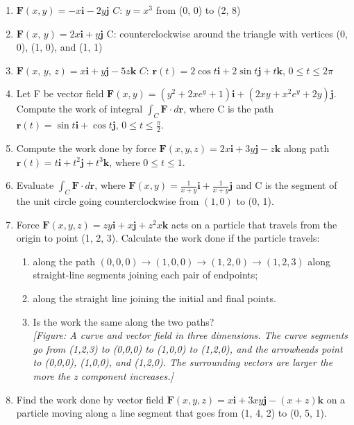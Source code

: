 \documentclass{exercises}
\begin{document}
\begin{enumerate}[resume]
\item $\mathbf{F}(x,y)=-x\mathbf{i}-2y\mathbf{j}$ $C{:}\,y=x^{3}$ from (0, 0) to (2, 8)
\item $\mathbf{F}(x,\,y)=2x\mathbf{i}+y\mathbf{j}$ C: counterclockwise around the triangle with vertices (0, 0), (1, 0), and (1, 1)
\item $\mathbf{F}(x,\,y,\,z)=x\mathbf{i}+y\mathbf{j}-5z\mathbf{k}$ $C{:}\,\mathbf{r}(t)=2\cos t\mathbf{i}+2\sin t\mathbf{j}+t\mathbf{k},\,0\le t\le2\pi$
\item Let F be vector field $\mathbf{F}(x,y)=(y^{2}+2xe^{y}+1)\mathbf{i}+(2xy+x^{2}e^{y}+2y)\mathbf{j}$. Compute the work of integral $\int_{C}^{}\mathbf{F}\cdot d\mathbf{r}$, where C is the path $\mathbf{r}(t)=\sin t\mathbf{i}+\cos t\mathbf{j},\,0\le t\le \frac{\pi}{2}$.
\item Compute the work done by force $\mathbf{F}(x,y,z)=2x\mathbf{i}+3y\mathbf{j}-z\mathbf{k}$ along path $\mathbf{r}(t)=t\mathbf{i}+t^{2}\mathbf{j}+t^{3}\mathbf{k}$, where $0\le t\le1$.
\item Evaluate $\int_{C}^{}\mathbf{F}\cdot d\mathbf{r}$, where $\mathbf{F}(x,y)=\frac{1}{x+y}\mathbf{i}+\frac{1}{x+y}\mathbf{j}$ and C is the segment of the unit circle going counterclockwise from $(1,0)$ to (0, 1).
\item Force $\mathbf{F}(x,y,z)=zy\mathbf{i}+x\mathbf{j}+z^{2}x\mathbf{k}$ acts on a particle that travels from the origin to point (1, 2, 3). Calculate the work done if the particle travels:
\begin{enumerate}[label=(\alph*)]
  \item along the path $(0,0,0)\to(1,0,0)\to(1,2,0)\to(1,2,3)$ along straight-line segments joining each pair of endpoints;
  \item along the straight line joining the initial and final points.
  \item Is the work the same along the two paths?\\ \textit{[Figure: A curve and vector field in three dimensions. The curve segments go from (1,2,3) to (0,0,0) to (1,0,0) to (1,2,0), and the arrowheads point to (0,0,0), (1,0,0), and (1,2,0). The surrounding vectors are larger the more the z component increases.]}
\end{enumerate}
\item Find the work done by vector field $\mathbf{F}(x,y,z)=x\mathbf{i}+3xy\mathbf{j}-(x+z)\mathbf{k}$ on a particle moving along a line segment that goes from (1, 4, 2) to (0, 5, 1).

\end{enumerate}
\end{document}
